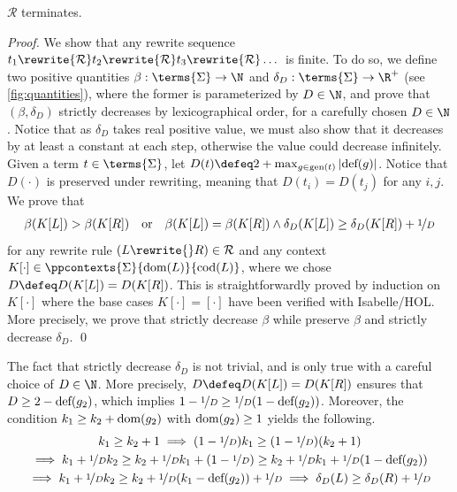 \begin{proposition}\label{prop:proterminaison}
    $\mathcal{R}$ terminates.
\end{proposition}
\begin{proof}
    We show that any rewrite sequence $t_1\rewrite{\mathcal{R}}t_2\rewrite{\mathcal{R}}t_3\rewrite{\mathcal{R}}\dots$ is finite. To do so, we define two positive quantities $\beta:\terms{\Sigma}\to\N$ and $\delta_D:\terms{\Sigma}\to\R^+$ (see \cref{fig:quantities}), where the former is parameterized by $D\in\N$, and prove that $(\beta,\delta_D)$ strictly decreases by lexicographical order, for a carefully chosen $D\in\N$. 
    Notice that as $\delta_D$ takes real positive value, we must also show that it decreases by at least a constant at each step, otherwise the value could decrease infinitely.   
    Given a term $t\in\terms{\Sigma}$, let $D(t)\defeq 2+\max_{g\in\textup{gen}(t)}|\textup{def}(g)|$. Notice that $D(\cdot)$ is preserved under rewriting, meaning that $D(t_i)=D(t_j)$ for any $i,j$. We prove that
    \begin{gather*}
        \beta(K[L])>\beta(K[R])
        \quad\text{or}\quad
        \beta(K[L])=\beta(K[R])\wedge\delta_D(K[L])\ge\delta_D(K[R])+\nicefrac{1}{D}
    \end{gather*}
    for any rewrite rule $(L\rewrite{}R)\in\mathcal{R}$ and any context $K[\cdot]\in\ppcontexts{\Sigma}{\textup{dom}(L)}{\textup{cod}(L)}$, where we chose $D\defeq D(K[L])=D(K[R])$. This is straightforwardly proved by induction on $K[\cdot]$ where the base cases $K[\cdot]=[\cdot]$ have been verified with Isabelle/HOL. More precisely, we prove  that  strictly decrease $\beta$ while  preserve $\beta$ and strictly decrease $\delta_D$. \qed
\end{proof}

\begin{remark}
    The fact that  strictly decrease $\delta_D$ is not trivial, and is only true with a careful choice of $D\in\N$. More precisely, $D\defeq D(K[L])=D(K[R])$ ensures that $D\ge 2-\textup{def}(g_2)$, which implies $1-\nicefrac{1}{D}\ge\nicefrac{1}{D}(1-\textup{def}(g_2))$. Moreover, the condition $k_1\ge k_2+\textup{dom}(g_2)$ with $\textup{dom}(g_2)\ge1$ yields the following.
    \begin{gather*}
        k_1\ge k_2+1
        \implies (1-\nicefrac{1}{D})k_1\ge (1-\nicefrac{1}{D})(k_2+1) \\
        \implies k_1 + \nicefrac{1}{D}k_2 \ge k_2 + \nicefrac{1}{D}k_1 + (1-\nicefrac{1}{D}) \ge k_2 + \nicefrac{1}{D}k_1 + \nicefrac{1}{D}(1-\textup{def}(g_2)) \\
        \implies k_1 + \nicefrac{1}{D}k_2 \ge k_2 + \nicefrac{1}{D}(k_1-\textup{def}(g_2)) + \nicefrac{1}{D}
        \implies \delta_D(L)\ge\delta_D(R)+\nicefrac{1}{D}
    \end{gather*}
\end{remark}

